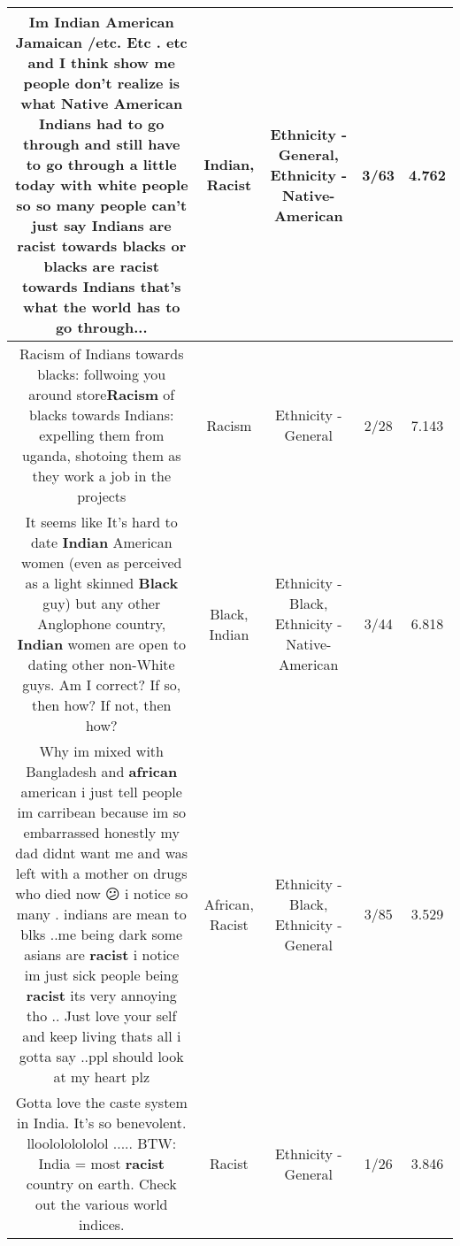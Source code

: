 \documentclass[11pt]{article}
\newlength\mylength
\begin{document}
\begin{center}
\begin{longtable}{|C{.65\mylength}|C{.30\mylength}|C{.12\mylength}|C{.12\mylength}|C{.12\mylength}|}
  \small Im \textbf{Indian} American Jamaican /etc. Etc . etc and I think show me people don't realize is what Native American Indians had to go through and still have to go through a little today with white people so so many people can't just say Indians are \textbf{racist} towards blacks or blacks are \textbf{racist} towards Indians that's what the world has to go through...\normalsize   & Indian, Racist & Ethnicity - General, Ethnicity - Native-American & 3/63 & 4.762 \\  \hline
  \small Racism of Indians towards blacks: follwoing you around store\textbf{Racism} of blacks towards Indians: expelling them from uganda, shotoing them as they work a job in the projects\normalsize   & Racism & Ethnicity - General & 2/28 & 7.143 \\  \hline
  \small It seems like It's hard to date \textbf{Indian} American women (even as perceived as a light skinned \textbf{Black} guy) but any other Anglophone country, \textbf{Indian} women are open to dating other non-White guys.  Am I correct?  If so, then how?  If not, then how?\normalsize   & Black, Indian & Ethnicity - Black, Ethnicity - Native-American & 3/44 & 6.818 \\  \hline
  \small Why im mixed with Bangladesh and \textbf{african} american i just tell people im carribean because im so embarrassed honestly my dad didnt want me and was left with a mother on drugs who died now 😕 i notice so many . indians are mean to blks ..me being dark some asians are \textbf{racist} i notice im just sick people being \textbf{racist} its very annoying tho .. Just love your self and keep living thats all i gotta say ..ppl should look at my heart plz\normalsize   & African, Racist & Ethnicity - Black, Ethnicity - General & 3/85 & 3.529 \\  \hline
  \small Gotta love the caste system in India.  It's so benevolent. lloolololololol ..... BTW:  India = most \textbf{racist} country on earth.  Check out the various world indices.\normalsize   & Racist & Ethnicity - General & 1/26 & 3.846 \\  \hline

\end{longtable}
\end{center}
\end{document}
